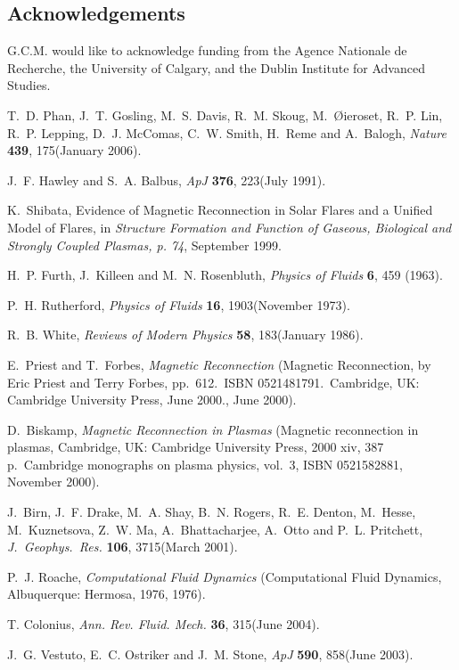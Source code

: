 \documentclass[square]{ws-procs11x85}
\def\apj{ApJ}
\def\jgr{J.~Geophys.~Res.}
\begin{document}
\begin{multicols}{2}
\section*{Acknowledgements}
G.C.M. would like to acknowledge funding from the Agence Nationale de Recherche, the University of Calgary, and the Dublin Institute for Advanced Studies.


\begin{thebibliography}{}


T.~D. {Phan}, J.~T. {Gosling}, M.~S. {Davis}, R.~M. {Skoug}, M.~{{\O}ieroset},
  R.~P. {Lin}, R.~P. {Lepping}, D.~J. {McComas}, C.~W. {Smith}, H.~{Reme} and
  A.~{Balogh}, {\em Nature} {\bf 439}, 175(January 2006).

J.~F. {Hawley} and S.~A. {Balbus}, {\em \apj} {\bf 376}, 223(July 1991).

K.~{Shibata}, {Evidence of Magnetic Reconnection in Solar Flares and a Unified
  Model of Flares}, in {\em Structure Formation and Function of Gaseous,
  Biological and Strongly Coupled Plasmas, p. 74\/}, September 1999.

H.~P. {Furth}, J.~{Killeen} and M.~N. {Rosenbluth}, {\em Physics of Fluids}
  {\bf 6}, 459 (1963).

P.~H. {Rutherford}, {\em Physics of Fluids} {\bf 16}, 1903(November 1973).

R.~B. {White}, {\em Reviews of Modern Physics} {\bf 58}, 183(January 1986).

E.~{Priest} and T.~{Forbes}, {\em {Magnetic Reconnection}} (Magnetic
  Reconnection, by Eric Priest and Terry Forbes, pp.~612.~ISBN
  0521481791.~Cambridge, UK: Cambridge University Press, June 2000., June
  2000).

D.~{Biskamp}, {\em {Magnetic Reconnection in Plasmas}} (Magnetic reconnection
  in plasmas, Cambridge, UK: Cambridge University Press, 2000 xiv, 387
  p.~Cambridge monographs on plasma physics, vol.~3, ISBN 0521582881, November
  2000).

J.~{Birn}, J.~F. {Drake}, M.~A. {Shay}, B.~N. {Rogers}, R.~E. {Denton},
  M.~{Hesse}, M.~{Kuznetsova}, Z.~W. {Ma}, A.~{Bhattacharjee}, A.~{Otto} and
  P.~L. {Pritchett}, {\em \jgr} {\bf 106}, 3715(March 2001).

P.~J. {Roache}, {\em {Computational Fluid Dynamics}} (Computational Fluid
  Dynamics, Albuquerque: Hermosa, 1976, 1976).

T. {Colonius}, {\em Ann. Rev. Fluid. Mech.} {\bf 36},
  315(June 2004).

J.~G. {Vestuto}, E.~C. {Ostriker} and J.~M. {Stone}, {\em \apj} {\bf 590},
  858(June 2003).

\end{thebibliography}

\end{multicols}
\end{document}
